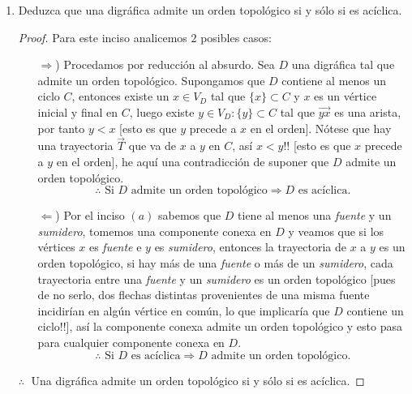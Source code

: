\documentclass{article}
\begin{document}
\begin{enumerate}
\begin{enumerate}
\begin{proof}
          \hspace*{2cm} $\therefore\;$ Si $D$ es ac\'iclica tiene al menos una fuente y un sumidero.
        \end{proof}

      \item Deduzca que una digr\'afica admite un orden topol\'ogico si y s\'olo
        si es ac\'iclica.

        \begin{proof}
          Para este inciso analicemos $2$ posibles casos:
          \begin{itemize}
            \item[$\Rightarrow$)] Procedamos por reducci\'on al absurdo. Sea $D$ una
              digr\'afica tal que admite un orden topol\'ogico. Supongamos que $D$
              contiene al menos un ciclo $C$, entonces existe un $x \in V_D$ tal que
              $\{x\} \subset C$ y $x$ es un v\'ertice inicial y final en $C$, luego
              existe $y \in V_D : \{y\} \subset C$ tal que $\vec{yx}$ es una arista,
              por tanto $y < x$ [esto es que $y$ precede a $x$ en el orden]. N\'otese
              que hay una trayectoria $\vec{T}$ que va de $x$ a $y$ en $C$, as\'i
              $x < y$!! [esto es que $x$ precede a $y$ en el orden], he aqu\'i una
              contradicci\'on de suponer que $D$ admite un orden topol\'ogico.
              \[
              \therefore \text{ Si $D$ admite un orden topol\'ogico}
              \Rightarrow D \text{ es ac\'iclica.}
              \]
            \item[$\Leftarrow$)] Por el inciso $(a)$ sabemos que $D$ tiene al menos
              una \textit{fuente} y un \textit{sumidero}, tomemos una componente
              conexa en $D$ y veamos que si los v\'ertices $x$ es \textit{fuente}
              e $y$ es \textit{sumidero}, entonces la trayectoria de $x$ a $y$ es
              un orden topol\'ogico, si hay m\'as de una \textit{fuente} o m\'as de
              un \textit{sumidero}, cada trayectoria entre una \textit{fuente} y un
              \textit{sumidero} es un orden topol\'ogico [pues de no serlo, dos flechas
                distintas provenientes de una misma fuente incidir\'ian en alg\'un
                v\'ertice en com\'un, lo que implicar\'ia que $D$ contiene un ciclo!!],
              as\'i la componente conexa admite un orden topol\'ogico y esto pasa
              para cualquier componente conexa en $D$.
              \[
              \therefore \text{ Si $D$ es ac\'iclica}
              \Rightarrow D \text{ admite un orden topol\'ogico.}
              \]
          \end{itemize}
          \hspace*{1.3cm} $\therefore\;$ Una digr\'afica admite un orden
          topol\'ogico si y s\'olo si es ac\'iclica.
        \end{proof}


\end{enumerate}
\end{enumerate}
\end{document}
